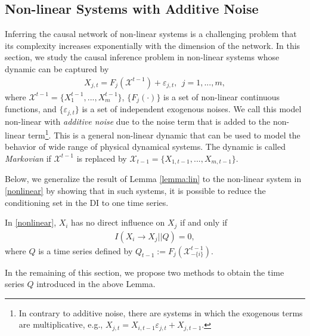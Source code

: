 \subsection{Non-linear Systems with Additive Noise}
Inferring the causal network of non-linear systems is a challenging problem that its complexity increases exponentially with the dimension of the network. 
In this section, we study the causal inference problem in non-linear systems whose dynamic can be captured by
\begin{align}\label{nonlinear}
    X_{j,t} = F_{j}(\mathcal{X}^{t-1}) + \varepsilon_{j,t}, \ \ j=1,...,m,
\end{align}
where $\mathcal{X}^{t-1}=\{X_{1}^{t-1},...,X_{m}^{t-1}\}$, $\{F_j(\cdot)\}$ is a set of non-linear continuous functions, and $\{\varepsilon_{j,t}\}$ is a set of independent exogenous noises.
We call this model non-linear with \textit{additive noise} due to the noise term that is added to the non-linear term\footnote{In contrary to additive noise, there are systems in which the exogenous terms are multiplicative, e.g., $X_{j,t}=X_{i,t-1}\varepsilon_{j,t}+X_{j,t-1}$.}.
This is a general non-linear dynamic that can be used to model the behavior of wide range of physical dynamical systems.
The dynamic is called \textit{Markovian} if $\mathcal{X}^{t-1}$ is replaced by $\mathcal{X}_{t-1}=\{X_{1,t-1},...,X_{m,t-1}\}$.

Below, we generalize the result of Lemma \ref{lemma:lin} to the non-linear system in \eqref{nonlinear} by showing that in such systems, it is possible to reduce the conditioning set in the DI to one time series. 
\clearpage
\begin{lemma}\label{lemma:nonlinear}
In \eqref{nonlinear}, $X_i$ has no direct influence on $X_j$ if and only if 
\begin{align}\label{eq:non-q}
I(X_{i}\rightarrow X_j || Q) =0,
\end{align}
where $Q$ is a time series defined by $Q_{t-1}:=F_{j}(\mathcal{X}^{t-1}_{-\{i\}})$. 
\end{lemma}
In the remaining of this section, we propose two methods to obtain the time series $Q$ introduced in the above Lemma. 

